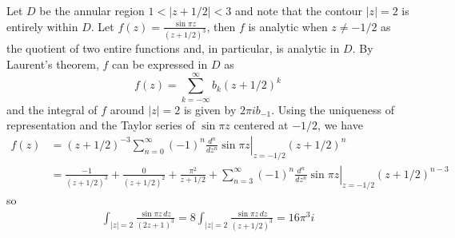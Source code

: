 \documentclass{homework}
\begin{document}
\begin{solution}
  Let $D$ be the annular region $1<|z+1/2|<3$ and note that the contour $|z|=2$ is entirely within $D$.  Let $f(z) = \frac{\sin \pi z}{(z+1/2)^3}$, then $f$ is analytic when $z\not=-1/2$ as the quotient of two entire functions and, in particular, is analytic in $D$. By Laurent's theorem, $f$ can be expressed in $D$ as
    $$
      f(z) = \sum_{k=-\infty}^\infty b_k (z+1/2)^k
    $$
    and the integral of $f$ around $|z| = 2$ is given by $2\pi i b_{-1}$.  Using the uniqueness of representation and the Taylor series of $\sin \pi z$ centered at $-1/2$, we have
    \begin{align*}
      f(z) 
      &= (z+1/2)^{-3} \sum_{n=0}^\infty (-1)^n \left.\frac{d^n}{dz^n} \sin\pi z\right|_{z=-1/2} (z+1/2)^n\\
      &= \frac{-1}{(z+1/2)^3} + \frac{0}{(z+1/2)^2} + \frac{\pi^2}{z+1/2} + \sum_{n=3}^\infty(-1)^n\left.\frac{d^n}{dz^n} \sin\pi z\right|_{z=-1/2} (z+1/2)^{n-3}
    \end{align*}
    so
    \begin{align*}
      \int_{|z|=2}\frac{ \sin \pi z\, dz }{ (2z + 1)^3 } 
      = 8\int_{|z|=2}\frac{ \sin \pi z\, dz }{ (z + 1/2)^3 } 
      = 16\pi^3 i 
    \end{align*}
\end{solution}



\end{document}
